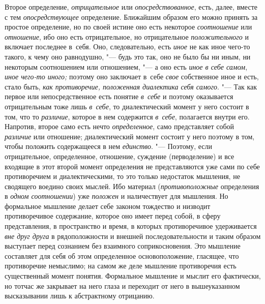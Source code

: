 Второе определение, {\em отрицательное} или
{\em опосредствованное}, есть, далее, вместе с тем {\em опосредствующее}
определение. Ближайшим образом его можно принять за простое
определение, но по своей истине оно есть некоторое
{\em соотношение} или {\em отношение}, ибо оно
есть отрицательное, но отрицательное {\em положительного} и
включает последнее в~себя. Оно, следовательно, есть {\em иное} не как
иное чего-то такого, к чему оно равнодушно, "--- будь это
так, оно не было бы ни иным, ни некоторым соотношением или отношением, "---
а оно есть {\em иное в
себе самом}, {\em иное чего-то иного;} поэтому оно заключает в~себе
{\em свое} собственное иное и есть, стало быть, {\em как
противоречие, положенная диалектика себя самого}. "--- Так как
первое или непосредственное есть понятие {\em в~себе} и поэтому
оказывается отрицательным тоже лишь {\em в~себе}, то
диалектический момент у него состоит в том, что то
{\em различие}, которое в нем содержится {\em в~себе},
полагается внутри его. Напротив, второе само есть нечто
{\em определенное}, само представляет собой {\em различие}
или отношение; диалектический момент состоит у него поэтому в
том, чтобы положить содержащееся в нем {\em единство}. "---
Поэтому, если отрицательное, определенное, отношение,
суждение (перводеление) и все входящие в этот второй момент определения не
представляются уже сами по себе противоречием и диалектическими, то это
только недостаток мышления, не сводящего воедино своих мыслей. Ибо материал
({\em противоположные} определения в {\em одном соотношении}) уже
{\em положен} и наличествует для мышления. Но формальное мышление делает
себе законом тождество и низводит противоречивое содержание,
которое оно имеет перед собой, в сферу представления, в пространство и
время, в которых противоречивое удерживается {\em вне друг друга} в
рядоположности и внешней последовательности и таким образом выступает перед
сознанием без взаимного соприкосновения. Это мышление составляет для себя
об этом определенное основоположение, гласящее, что противоречие немыслимо;
на самом же деле мышление противоречия есть существенный момент понятия.
Формальное мышление и мыслит его фактически, но тотчас же закрывает на него
глаза и переходит от него в вышеуказанном высказывании лишь к абстрактному
отрицанию.

